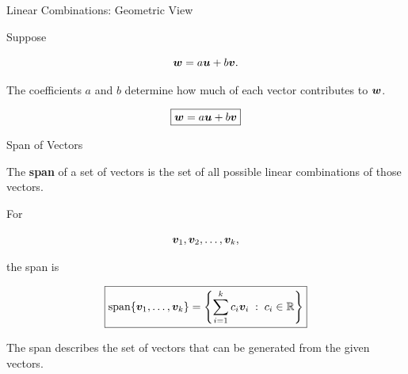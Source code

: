 \begin{frame}{Linear Combinations: Geometric View}

Suppose

\[
\bm{w}=a\bm{u}+b\bm{v}.
\]

The coefficients $a$ and $b$ determine how much of each vector
contributes to $\bm{w}$.

\vspace{0.3cm}

\begin{center}


\end{center}

\[
\boxed{\bm{w}=a\bm{u}+b\bm{v}}
\]

\end{frame}



\begin{frame}{Span of Vectors}

The \textbf{span} of a set of vectors is the set of all
possible linear combinations of those vectors.

For

\[
\bm{v}_1,\bm{v}_2,\ldots,\bm{v}_k,
\]

the span is

\[
\boxed{
\operatorname{span}
\{\bm{v}_1,\ldots,\bm{v}_k\}
=
\left\{
\sum_{i=1}^{k}c_i\bm{v}_i
\;:\;
c_i\in\mathbb{R}
\right\}
}
\]

\vspace{0.4cm}

The span describes the set of vectors that can be generated
from the given vectors.

\end{frame}


